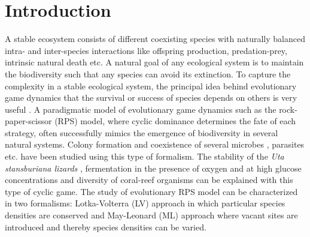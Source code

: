 \documentclass[aps, pre, twocolumn, amsmath, superscriptaddress,showkeys,showpacs]{revtex4-1}
\begin{document}
	\section{Introduction} 
	\label{intro}
	\noindent
	{\color{red}A stable ecosystem consists of different coexisting species with naturally balanced intra- and inter-species interactions like offspring production, predation-prey, intrinsic natural death etc. A natural goal of any ecological system is to maintain the biodiversity such that any species can avoid its extinction.} To capture {\color{red} the complexity in a stable ecological system, the principal idea behind evolutionary game dynamics that the survival or success of species depends on others is very useful \cite{szabo2007evolutionary,perc2017statistical,szolnoki2014cyclic,pennisi2005determines, mobilia2016influence,traulsen2006stochastic}.}
	 A paradigmatic {\color{red}model of} evolutionary game dynamics such as the rock-paper-scissor (RPS) model, where  cyclic dominance \cite{arunachalam2020rock, kerr2002local, park2019fitness, reichenbach2007mobility, hashimoto2018clustering}  determines the fate of each strategy, {\color{red}often successfully mimics the emergence} of biodiversity in several natural systems. Colony formation and coexistence of several microbes \cite{ke2020effects, momeni2017lotka, kerr2002local,nahum2011evolution}, parasites \cite{cameron2009parasite, segura2013competition} etc. have been studied using this type of formalism. The stability of the {\it Uta stansburiana lizards} \cite{sinervo1996rock}, fermentation in the presence of oxygen and at high glucose concentrations \cite{pfeiffer2014evolutionary}  and diversity of coral-reef organisms \cite{jackson1975alleopathy} can  be explained with this type of cyclic game. 
	 {\color{red} The study of evolutionary RPS model can be characterized \cite{sinervo1996rock} in two formalisms: Lotka-Volterra (LV) approach \cite{bacaer2011lotka, lotka1920analytical, volterra1926fluctuations} in which particular species densities are conserved and May-Leonard (ML) approach \cite{chi1998asymmetric} where vacant sites are introduced and thereby species densities can be varied.}
\end{document}

